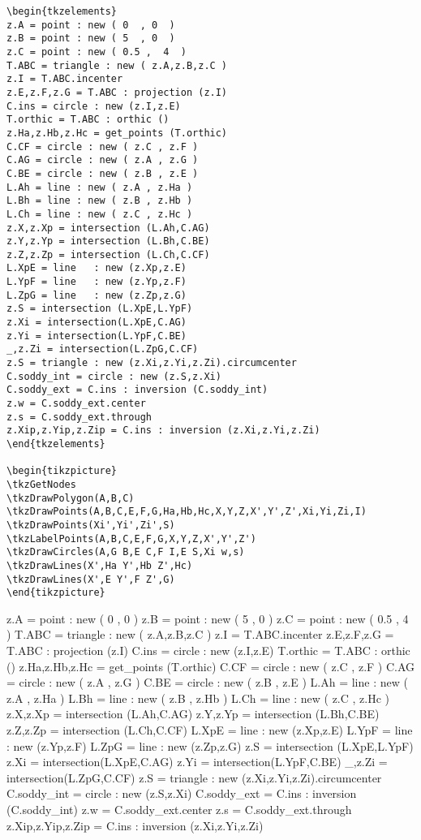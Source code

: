 \begin{Verbatim}
\begin{tkzelements}
z.A = point : new ( 0  , 0  )
z.B = point : new ( 5  , 0  )
z.C = point : new ( 0.5 ,  4  )
T.ABC = triangle : new ( z.A,z.B,z.C )
z.I = T.ABC.incenter
z.E,z.F,z.G = T.ABC : projection (z.I)
C.ins = circle : new (z.I,z.E)
T.orthic = T.ABC : orthic ()
z.Ha,z.Hb,z.Hc = get_points (T.orthic)
C.CF = circle : new ( z.C , z.F )
C.AG = circle : new ( z.A , z.G )
C.BE = circle : new ( z.B , z.E )
L.Ah = line : new ( z.A , z.Ha )
L.Bh = line : new ( z.B , z.Hb )
L.Ch = line : new ( z.C , z.Hc )
z.X,z.Xp = intersection (L.Ah,C.AG)
z.Y,z.Yp = intersection (L.Bh,C.BE)
z.Z,z.Zp = intersection (L.Ch,C.CF)
L.XpE = line   : new (z.Xp,z.E)
L.YpF = line   : new (z.Yp,z.F)
L.ZpG = line   : new (z.Zp,z.G)
z.S = intersection (L.XpE,L.YpF)
z.Xi = intersection(L.XpE,C.AG)
z.Yi = intersection(L.YpF,C.BE)
_,z.Zi = intersection(L.ZpG,C.CF)
z.S = triangle : new (z.Xi,z.Yi,z.Zi).circumcenter
C.soddy_int = circle : new (z.S,z.Xi)
C.soddy_ext = C.ins : inversion (C.soddy_int)
z.w = C.soddy_ext.center
z.s = C.soddy_ext.through
z.Xip,z.Yip,z.Zip = C.ins : inversion (z.Xi,z.Yi,z.Zi)
\end{tkzelements}

\begin{tikzpicture}
\tkzGetNodes
\tkzDrawPolygon(A,B,C)
\tkzDrawPoints(A,B,C,E,F,G,Ha,Hb,Hc,X,Y,Z,X',Y',Z',Xi,Yi,Zi,I)
\tkzDrawPoints(Xi',Yi',Zi',S)
\tkzLabelPoints(A,B,C,E,F,G,X,Y,Z,X',Y',Z')
\tkzDrawCircles(A,G B,E C,F I,E S,Xi w,s)
\tkzDrawLines(X',Ha Y',Hb Z',Hc)
\tkzDrawLines(X',E Y',F Z',G)
\end{tikzpicture}
\end{Verbatim}

\begin{tkzelements}
z.A = point : new ( 0  , 0  )
z.B = point : new ( 5  , 0  )
z.C = point : new ( 0.5 ,  4  )
T.ABC = triangle : new ( z.A,z.B,z.C )
z.I = T.ABC.incenter
z.E,z.F,z.G = T.ABC : projection (z.I)
C.ins = circle : new (z.I,z.E)
T.orthic = T.ABC : orthic ()
z.Ha,z.Hb,z.Hc = get_points (T.orthic)
C.CF = circle : new ( z.C , z.F )
C.AG = circle : new ( z.A , z.G )
C.BE = circle : new ( z.B , z.E )
L.Ah = line : new ( z.A , z.Ha )
L.Bh = line : new ( z.B , z.Hb )
L.Ch = line : new ( z.C , z.Hc )
z.X,z.Xp = intersection (L.Ah,C.AG)
z.Y,z.Yp = intersection (L.Bh,C.BE)
z.Z,z.Zp = intersection (L.Ch,C.CF)
L.XpE = line   : new (z.Xp,z.E)
L.YpF = line   : new (z.Yp,z.F)
L.ZpG = line   : new (z.Zp,z.G)
z.S = intersection (L.XpE,L.YpF)
z.Xi = intersection(L.XpE,C.AG)
z.Yi = intersection(L.YpF,C.BE)
_,z.Zi = intersection(L.ZpG,C.CF)
z.S = triangle : new (z.Xi,z.Yi,z.Zi).circumcenter
C.soddy_int = circle : new (z.S,z.Xi)
C.soddy_ext = C.ins : inversion (C.soddy_int)
z.w = C.soddy_ext.center
z.s = C.soddy_ext.through
z.Xip,z.Yip,z.Zip = C.ins : inversion (z.Xi,z.Yi,z.Zi)
\end{tkzelements}

